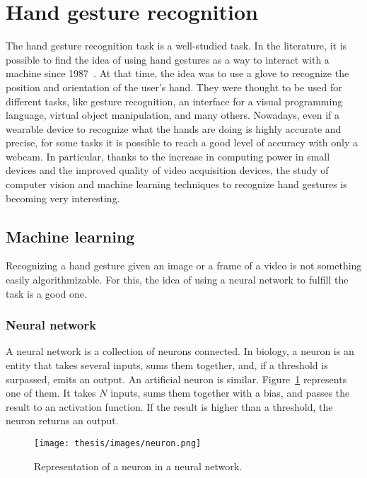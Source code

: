 \documentclass[../thesis.tex]{subfiles}
\begin{document}
\section{Hand gesture recognition}
The hand gesture recognition task is a well-studied task. In the literature, it is possible to find the idea of using hand gestures as a way to interact with a machine since 1987~\cite{paper:hand_gesture_interface_device}. At that time, the idea was to use a glove to recognize the position and orientation of the user’s hand. They were thought to be used for different tasks, like gesture recognition, an interface for a visual programming language, virtual object manipulation, and many others. Nowadays, even if a wearable device to recognize what the hands are doing is highly accurate and precise, for some tasks it is possible to reach a good level of accuracy with only a webcam. In particular, thanks to the increase in computing power in small devices and the improved quality of video acquisition devices, the study of computer vision and machine learning techniques to recognize hand gestures is becoming very interesting.

\subsection{Machine learning}
Recognizing a hand gesture given an image or a frame of a video is not something easily algorithmizable. For this, the idea of using a neural network to fulfill the task is a good one.

\subsubsection{Neural network}
A neural network is a collection of neurons connected. In biology, a neuron is an entity that takes several inputs, sums them together, and, if a threshold is surpassed, emits an output. An artificial neuron is similar. Figure~\ref{fig:neuron} represents one of them. It takes $N$ inputs, sums them together with a bias, and passes the result to an activation function. If the result is higher than a threshold, the neuron returns an output.

\begin{figure}[H]
    \centering
    \texttt{[image: thesis/images/neuron.png]}
    \caption{Representation of a neuron in a neural network.}
    \label{fig:neuron}
\end{figure}
\end{document}

